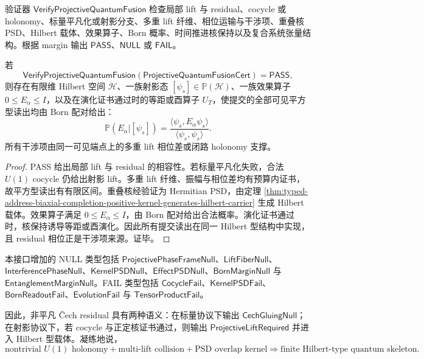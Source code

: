 验证器 \(\mathsf{VerifyProjectiveQuantumFusion}\) 检查局部 lift 与 residual、cocycle 或 holonomy、标量平凡化或射影分支、多重 lift 纤维、相位运输与干涉项、重叠核 PSD、Hilbert 载体、效果算子、Born 概率、时间推进核保持以及复合系统张量结构。根据 margin 输出 \(\mathsf{PASS}\)、\(\mathsf{NULL}\) 或 \(\mathsf{FAIL}\)。

\begin{theorem}[射影量子融合证书的可靠性]\label{thm:typed-address-biaxial-completion-projective-quantum-fusion-soundness}
若
\[
\mathsf{VerifyProjectiveQuantumFusion}
(\mathsf{ProjectiveQuantumFusionCert})
=
\mathsf{PASS},
\]
则存在有限维 Hilbert 空间 \(\mathcal H\)、一族射影态 \([\psi_s]\in\mathbb P(\mathcal H)\)、一族效果算子 \(0\le E_\alpha\le I\)，以及在演化证书通过时的等距或酉算子 \(U_T\)，使提交的全部可见平方型读出均由 Born 配对给出：
\[
\mathbb P(E_\alpha|[\psi_s])
=
\frac{\langle\psi_s,E_\alpha\psi_s\rangle}{\langle\psi_s,\psi_s\rangle}.
\]
所有干涉项由同一可见端点上的多重 lift 相位差或闭路 holonomy 支撑。
\end{theorem}
\begin{proof}
PASS 给出局部 lift 与 residual 的相容性。若标量平凡化失败，合法 \(U(1)\) cocycle 仍给出射影 lift。多重 lift 纤维、振幅与相位差均有预算内证书，故平方型读出有有限区间。重叠核经验证为 Hermitian PSD，由定理 \ref{thm:typed-address-biaxial-completion-positive-kernel-generates-hilbert-carrier} 生成 Hilbert 载体。效果算子满足 \(0\le E_\alpha\le I\)，由 Born 配对给出合法概率。演化证书通过时，核保持诱导等距或酉演化。因此所有提交读出在同一 Hilbert 型结构中实现，且 residual 相位正是干涉项来源。证毕。
\end{proof}

本接口增加的 NULL 类型包括 \(\mathsf{ProjectivePhaseFrameNull}\)、\(\mathsf{LiftFiberNull}\)、\(\mathsf{InterferencePhaseNull}\)、\(\mathsf{KernelPSDNull}\)、\(\mathsf{EffectPSDNull}\)、\(\mathsf{BornMarginNull}\) 与 \(\mathsf{EntanglementMarginNull}\)。FAIL 类型包括 \(\mathsf{CocycleFail}\)、\(\mathsf{KernelPSDFail}\)、\(\mathsf{BornReadoutFail}\)、\(\mathsf{EvolutionFail}\) 与 \(\mathsf{TensorProductFail}\)。

因此，非平凡 \v{C}ech residual 具有两种语义：在标量协议下输出 \(\mathsf{CechGluingNull}\)；在射影协议下，若 cocycle 与正定核证书通过，则输出 \(\mathsf{ProjectiveLiftRequired}\) 并进入 Hilbert 型载体。凝练地说，
\[
\text{nontrivial }U(1)\text{ holonomy}
+
\text{multi-lift collision}
+
\text{PSD overlap kernel}
\Longrightarrow
\text{finite Hilbert-type quantum skeleton}.
\]
